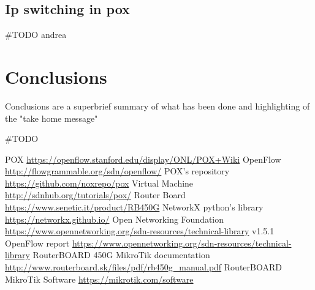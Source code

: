 \documentclass[conference,10pt]{IEEEtran}
\begin{document}
  \subsection{Ip switching in pox}
  \#TODO andrea
  
\section{Conclusions}\label{sec:conclusion}
Conclusions are a superbrief summary of what has been done and highlighting of the "take home message"

\#TODO
  

\begin{thebibliography}{99}
	 POX \url{https://openflow.stanford.edu/display/ONL/POX+Wiki}
	 OpenFlow \url{http://flowgrammable.org/sdn/openflow/}
	 POX's repository \url{https://github.com/noxrepo/pox}
	 Virtual Machine \url{http://sdnhub.org/tutorials/pox/}
	 Router Board \url{https://www.senetic.it/product/RB450G}
	 NetworkX python's library \url{https://networkx.github.io/}
	 Open Networking Foundation \url{https://www.opennetworking.org/sdn-resources/technical-library}
	 v1.5.1 OpenFlow report \url{https://www.opennetworking.org/sdn-resources/technical-library}
	 RouterBOARD 450G MikroTik documentation \url{http://www.routerboard.sk/files/pdf/rb450g_manual.pdf}
	 RouterBOARD MikroTik Software \url{https://mikrotik.com/software}
\end{thebibliography}
\end{document}
